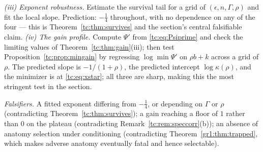 \documentclass[11pt]{article}
\newcommand{\PrintRefs}{\printbibliography[title={References}]}%
\newcommand{\PrintRefs}{}%
\numberwithin{equation}{section}
\theoremstyle{plain}
\theoremstyle{definition}
\theoremstyle{remark}
\begin{document}
\emph{(iii) Exponent robustness.} Estimate the survival tail for a grid
of $(\epsilon,n,\Gamma,\rho)$ and fit the local slope. Prediction:
$-\tfrac14$ throughout, with no dependence on any of the four ---
this is Theorem~\ref{tc:thm:survives} and the section's central
falsifiable claim. \emph{(iv) The gain profile.} Compute $\Psi'$ from
\eqref{tc:eq:Psiprime} and check the limiting values of
Theorem~\ref{tc:thm:gain}(iii); then test
Proposition~\ref{tc:prop:mingain} by regressing $\log\min\Psi'$ on
$\rho b+k$ across a grid of $\rho$. The predicted slope is
$-1/(1+\rho)$, the
predicted intercept $\log\kappa(\rho)$, and the minimizer is at
\eqref{tc:eq:xstar}; all three are sharp, making this the most stringent
test in the section.

\emph{Falsifiers.} A fitted exponent differing from $-\tfrac14$, or
depending on $\Gamma$ or $\rho$ (contradicting
Theorem~\ref{tc:thm:survives}); a gain reaching a floor of $1$ rather
than $0$ on the plateau (contradicting
Remark~\ref{tc:rem:speccorr}(b)); an absence of anatomy selection under
conditioning (contradicting Theorem~\ref{gr1:thm:trapped}, which makes
adverse anatomy eventually fatal and hence selectable).

\PrintRefs
\end{document}
